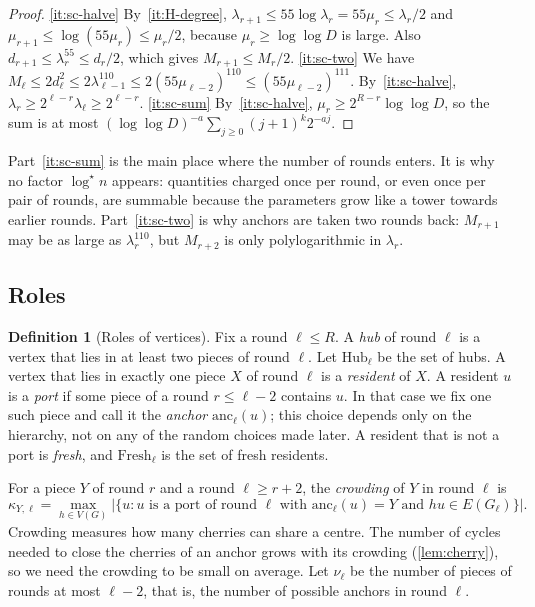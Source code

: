 \documentclass[11pt]{article}
\theoremstyle{definition}
\newtheorem{definition}[theorem]{Definition}
\theoremstyle{remark}
\numberwithin{equation}{section}
\numberwithin{figure}{section}
\numberwithin{table}{section}
\newcommand{\Hub}{\mathrm{Hub}}
\newcommand{\Fresh}{\mathrm{Fresh}}
\newcommand{\anc}{\mathrm{anc}}
\begin{document}
\begin{proof}
\ref{it:sc-halve} By~\ref{it:H-degree},
$\lambda_{r+1}\le55\log\lambda_r=55\mu_r\le\lambda_r/2$ and
$\mu_{r+1}\le\log(55\mu_r)\le\mu_r/2$, because $\mu_r\ge\log\log D$ is large.
Also $d_{r+1}\le\lambda_r^{55}\le d_r/2$, which gives $M_{r+1}\le M_r/2$.
\ref{it:sc-two} We have $M_\ell\le2d_\ell^2\le2\lambda_{\ell-1}^{110}
\le2(55\mu_{\ell-2})^{110}\le(55\mu_{\ell-2})^{111}$. By~\ref{it:sc-halve},
$\lambda_r\ge2^{\ell-r}\lambda_\ell\ge2^{\ell-r}$.
\ref{it:sc-sum} By~\ref{it:sc-halve}, $\mu_r\ge2^{R-r}\log\log D$, so the sum
is at most $(\log\log D)^{-a}\sum_{j\ge0}(j+1)^k2^{-aj}$.
\end{proof}

Part~\ref{it:sc-sum} is the main place where the number of rounds enters. It is
why no factor $\log^\star n$ appears: quantities charged once per round, or even
once per pair of rounds, are summable because the parameters grow like a tower
towards earlier rounds. Part~\ref{it:sc-two} is why anchors are taken two rounds
back: $M_{r+1}$ may be as large as $\lambda_r^{110}$, but $M_{r+2}$ is only
polylogarithmic in $\lambda_r$.

\subsection{Roles}\label{sec:roles}

\begin{definition}[Roles of vertices]\label{def:roles}
Fix a round $\ell\le R$. A \emph{hub} of round $\ell$ is a vertex that lies in
at least two pieces of round $\ell$. Let $\Hub_\ell$ be the set of hubs. A
vertex that lies in exactly one piece $X$ of round $\ell$ is a \emph{resident}
of $X$. A resident $u$ is a \emph{port} if some piece of a round $r\le\ell-2$
contains $u$. In that case we fix one such piece and call it the \emph{anchor}
$\anc_\ell(u)$; this choice depends only on the hierarchy, not on any of the
random choices made later. A resident that is not a port is \emph{fresh}, and
$\Fresh_\ell$ is the set of fresh residents.
\end{definition}

For a piece $Y$ of round $r$ and a round $\ell\ge r+2$, the \emph{crowding} of
$Y$ in round $\ell$ is
\[
\kappa_{Y,\ell}=\max_{h\in V(G)}\bigl|\{u: u\text{ is a port of round }\ell
\text{ with }\anc_\ell(u)=Y\text{ and }hu\in E(G_\ell)\}\bigr|.
\]
Crowding measures how many cherries can share a centre. The number of cycles
needed to close the cherries of an anchor grows with its crowding
(\cref{lem:cherry}), so we need the crowding to be small on average. Let
$\nu_\ell$ be the number of pieces of rounds at most $\ell-2$, that is, the
number of possible anchors in round $\ell$.
\end{document}
